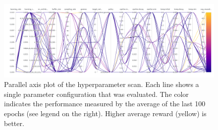 \documentclass{article}
\begin{document}
\begin{figure}[h!]
   \centering
   \includegraphics[width=\textwidth]{assets/hyperparamter-scan/W&B Chart 3_30_2023, 2 24 25 PM.png}
   \caption{Parallel axis plot of the hyperparameter scan. 
      Each line shows a single parameter configuration that was evaluated. 
      The color indicates the performance measured by the average of the last 100 epochs (see legend on the right). 
      Higher average reward (yellow) is better.
   }
   \label{fig_hyperparameter_scan_parallel_axis}
\end{figure}
\end{document}
